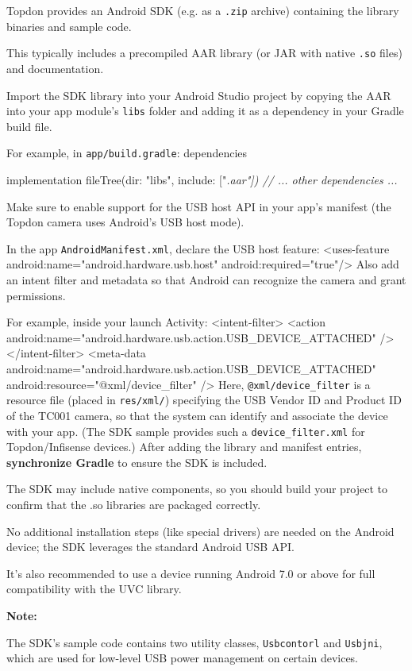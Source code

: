 Topdon provides an Android SDK (e.g. as a \texttt{.zip} archive) containing the library binaries and sample code.

This typically includes a precompiled AAR library (or JAR with native \texttt{.so} files) and documentation.

Import the SDK library into your Android Studio project by copying the AAR into your app module's \texttt{libs} folder and adding it as a dependency in your Gradle build file.

For example, in \texttt{app/build.gradle}: dependencies { implementation fileTree(dir: "libs", include: ["\textit{.aar"]) // ... other dependencies ... }

Make sure to enable support for the USB host API in your app's manifest (the Topdon camera uses Android's USB host mode).

In the app \texttt{AndroidManifest.xml}, declare the USB host feature: <uses-feature android:name="android.hardware.usb.host" android:required="true"/> Also add an intent filter and metadata so that Android can recognize the camera and grant permissions.

For example, inside your launch Activity: <intent-filter> <action android:name="android.hardware.usb.action.USB_DEVICE_ATTACHED" /> </intent-filter> <meta-data android:name="android.hardware.usb.action.USB_DEVICE_ATTACHED" android:resource="@xml/device_filter" /> Here, \texttt{@xml/device_filter} is a resource file (placed in \texttt{res/xml/}) specifying the USB Vendor ID and Product ID of the TC001 camera, so that the system can identify and associate the device with your app. (The SDK sample provides such a \texttt{device_filter.xml} for Topdon/Infisense devices.) After adding the library and manifest entries, \textbf{synchronize Gradle}
 to ensure the SDK is included.

The SDK may include native components, so you should build your project to confirm that the .so libraries are packaged correctly.

No additional installation steps (like special drivers) are needed on the Android device; the SDK leverages the standard Android USB API.

It's also recommended to use a device running Android 7.0 or above for full compatibility with the UVC library.

\textbf{Note:}

The SDK's sample code contains two utility classes, \texttt{Usbcontorl} and \texttt{Usbjni}, which are used for low-level USB power management on certain devices.

}
